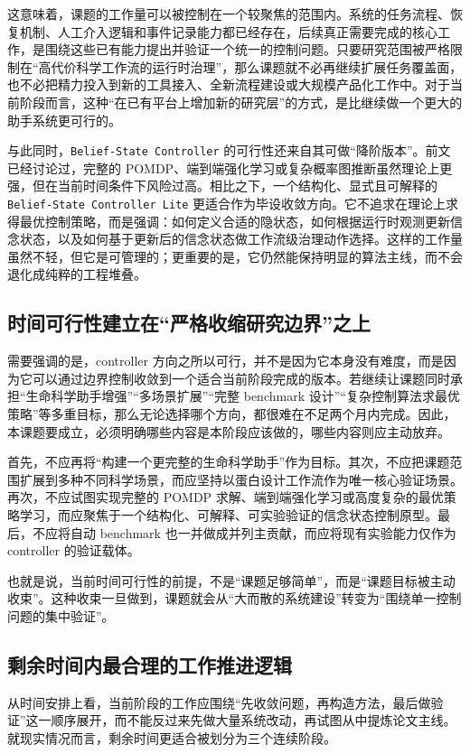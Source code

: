这意味着，课题的工作量可以被控制在一个较聚焦的范围内。系统的任务流程、恢复机制、人工介入逻辑和事件记录能力都已经存在，后续真正需要完成的核心工作，是围绕这些已有能力提出并验证一个统一的控制问题。只要研究范围被严格限制在“高代价科学工作流的运行时治理”，那么课题就不必再继续扩展任务覆盖面，也不必把精力投入到新的工具接入、全新流程建设或大规模产品化工作中。对于当前阶段而言，这种“在已有平台上增加新的研究层”的方式，是比继续做一个更大的助手系统更可行的。

与此同时，\texttt{Belief-State Controller} 的可行性还来自其可做“降阶版本”。前文已经讨论过，完整的 POMDP、端到端强化学习或复杂概率图推断虽然理论上更强，但在当前时间条件下风险过高。相比之下，一个结构化、显式且可解释的 \texttt{Belief-State Controller Lite} 更适合作为毕设收敛方向。它不追求在理论上求得最优控制策略，而是强调：如何定义合适的隐状态，如何根据运行时观测更新信念状态，以及如何基于更新后的信念状态做工作流级治理动作选择。这样的工作量虽然不轻，但它是可管理的；更重要的是，它仍然能保持明显的算法主线，而不会退化成纯粹的工程堆叠。

\subsection{时间可行性建立在“严格收缩研究边界”之上}

需要强调的是，controller 方向之所以可行，并不是因为它本身没有难度，而是因为它可以通过边界控制收敛到一个适合当前阶段完成的版本。若继续让课题同时承担“生命科学助手增强”“多场景扩展”“完整 benchmark 设计”“复杂控制算法求最优策略”等多重目标，那么无论选择哪个方向，都很难在不足两个月内完成。因此，本课题要成立，必须明确哪些内容是本阶段应该做的，哪些内容则应主动放弃。

首先，不应再将“构建一个更完整的生命科学助手”作为目标。其次，不应把课题范围扩展到多种不同科学场景，而应坚持以蛋白设计工作流作为唯一核心验证场景。再次，不应试图实现完整的 POMDP 求解、端到端强化学习或高度复杂的最优策略学习，而应聚焦于一个结构化、可解释、可实验验证的信念状态控制原型。最后，不应将自动 benchmark 也一并做成并列主贡献，而应将现有实验能力仅作为 controller 的验证载体。

也就是说，当前时间可行性的前提，不是“课题足够简单”，而是“课题目标被主动收束”。这种收束一旦做到，课题就会从“大而散的系统建设”转变为“围绕单一控制问题的集中验证”。

\subsection{剩余时间内最合理的工作推进逻辑}

从时间安排上看，当前阶段的工作应围绕“先收敛问题，再构造方法，最后做验证”这一顺序展开，而不能反过来先做大量系统改动，再试图从中提炼论文主线。就现实情况而言，剩余时间更适合被划分为三个连续阶段。

